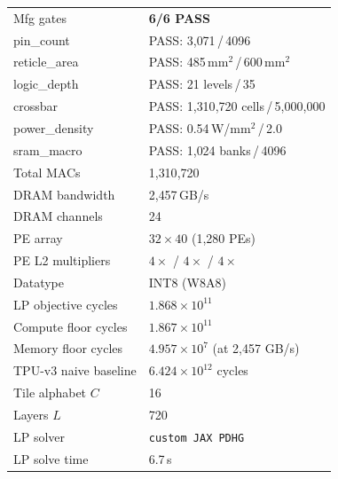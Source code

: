 \begin{table}[h]
\begin{tabular}{@{}ll@{}}
\midrule
Mfg gates               & \textcolor{green!60!black}{\textbf{6/6 PASS}} \\
\quad pin\_count         & PASS: 3{,}071\,/\,4096 \\
\quad reticle\_area      & PASS: 485\,mm$^2$\,/\,600\,mm$^2$ \\
\quad logic\_depth       & PASS: 21 levels\,/\,35 \\
\quad crossbar           & PASS: 1{,}310{,}720 cells\,/\,5{,}000{,}000 \\
\quad power\_density     & PASS: 0.54\,W/mm$^2$\,/\,2.0 \\
\quad sram\_macro        & PASS: 1{,}024 banks\,/\,4096 \\
\midrule
Total MACs              & 1{,}310{,}720 \\
DRAM bandwidth          & 2{,}457\,GB/s \\
DRAM channels           & 24 \\
PE array                & $32 \times 40$ (1{,}280 PEs) \\
PE L2 multipliers       & $4\times$ / $4\times$ / $4\times$ \\
Datatype                & INT8 (W8A8) \\
LP objective cycles     & $1.868 \times 10^{11}$ \\
Compute floor cycles    & $1.867 \times 10^{11}$ \\
Memory floor cycles     & $4.957 \times 10^{7}$ (at 2{,}457 GB/s) \\
TPU-v3 naive baseline   & $6.424 \times 10^{12}$ cycles \\
Tile alphabet $C$       & 16 \\
Layers $L$              & 720 \\
LP solver               & \texttt{custom JAX PDHG} \\
LP solve time           & 6.7\,s \\
\bottomrule
\end{tabular}
\end{table}


